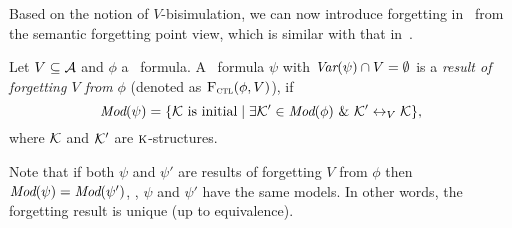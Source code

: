 \documentclass[letterpaper]{article} %
\begin{document}
Based on the notion of $V$-bisimulation, we can now introduce forgetting in \CTL\ from the semantic forgetting point view, which is similar with that in~\cite{renyansfirstpaper}.
\begin{definition}[Forgetting]\label{def:V:forgetting}
  Let $V\subseteq\cal A$ and $\phi$ a \CTL\ formula.
A \CTL\ formula $\psi$ with $\textit{Var}(\psi)\cap V=\emptyset$
is a {\em result of forgetting $V$ from} $\phi$ (denoted as ${\textsc{F}_{\textsc{ctl}}}(\phi,V)$), if
\begin{equation*}
  \textit{Mod}(\psi)=\{{\cal K}\mbox{ is initial}\mid \exists {\cal K}'\in\textit{Mod}(\phi)\ \&\ {\cal K}'\leftrightarrow_V{\cal K}\},
\end{equation*}
where $\cal K$ and ${\cal K}'$ are $\textsc{k}$-structures.
\end{definition}
Note that if both $\psi$ and $\psi'$ are results of forgetting $V$ from $\phi$ then
$\textit{Mod}(\psi)=\textit{Mod}(\psi')$, \ie, $\psi$ and $\psi'$ have the same models. In other words,  the forgetting result is unique (up to equivalence).
\end{document}
